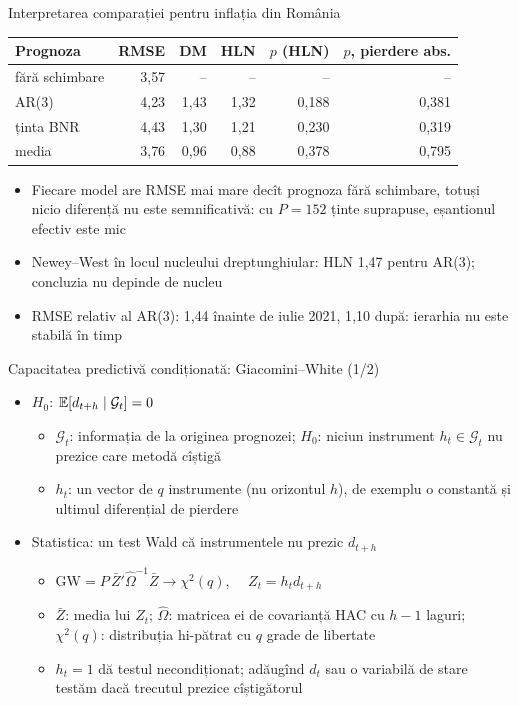 \begin{frame}{Interpretarea comparației pentru inflația din România}
\itemsize{\footnotesize}
\begin{center}
\footnotesize
\begin{tabular}{lrrrrr}
\toprule
\textbf{Prognoza} & \textbf{RMSE} & \textbf{DM} & \textbf{HLN} & \textbf{$p$ (HLN)} & \textbf{$p$, pierdere abs.} \\
\midrule
fără schimbare & 3{,}57 & -- & -- & -- & -- \\
AR(3) & 4{,}23 & 1{,}43 & 1{,}32 & 0{,}188 & 0{,}381 \\
ținta BNR & 4{,}43 & 1{,}30 & 1{,}21 & 0{,}230 & 0{,}319 \\
media & 3{,}76 & 0{,}96 & 0{,}88 & 0{,}378 & 0{,}795 \\
\bottomrule
\end{tabular}
\end{center}
\begin{itemize}
    \item Fiecare model are RMSE mai mare decît prognoza fără schimbare, totuși nicio diferență nu este semnificativă: cu $P = 152$ ținte suprapuse, eșantionul efectiv este mic
    \item Newey--West în locul nucleului dreptunghiular: HLN 1{,}47 pentru AR(3); concluzia nu depinde de nucleu
    \item RMSE relativ al AR(3): 1{,}44 înainte de iulie 2021, 1{,}10 după: ierarhia nu este stabilă în timp 
\end{itemize}
\end{frame}

\begin{frame}{Capacitatea predictivă condiționată: Giacomini--White (1/2)}
\itemsize{\small}
\begin{itemize}
    \item $H_0$: $\mathbb{E}[d_{t+h} \mid \mathcal{G}_t] = 0$ 
    \begin{itemize}
        \item $\mathcal{G}_t$: informația de la originea prognozei; $H_0$: niciun instrument $h_t \in \mathcal{G}_t$ nu prezice care metodă cîștigă
        \item $h_t$: un vector de $q$ instrumente (nu orizontul $h$), de exemplu o constantă și ultimul diferențial de pierdere
    \end{itemize}
    \item Statistica: un test Wald că instrumentele nu prezic $d_{t+h}$
    \begin{itemize}
        \item $\mathrm{GW} = P\,\bar Z'\hat\Omega^{-1}\bar Z \to \chi^2(q)$, $\quad Z_t = h_t d_{t+h}$
        \item $\bar Z$: media lui $Z_t$; $\hat\Omega$: matricea ei de covarianță HAC cu $h - 1$ laguri; $\chi^2(q)$: distribuția hi-pătrat cu $q$ grade de libertate
        \item $h_t = 1$ dă testul necondiționat; adăugînd $d_t$ sau o variabilă de stare testăm dacă trecutul prezice cîștigătorul
    \end{itemize}
\end{itemize}
\end{frame}

